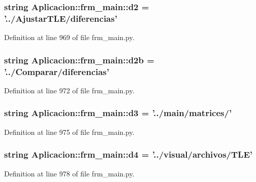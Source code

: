 \subsubsection[{d2}]{\setlength{\rightskip}{0pt plus 5cm}string {\bf \-Aplicacion\-::frm\-\_\-main\-::d2} = '../\-Ajustar\-T\-L\-E/diferencias'}\label{namespace_aplicacion_1_1frm__main_a5b795ba5921a46666c1e779b05cdf3ee}


\-Definition at line 969 of file frm\-\_\-main.\-py.

\subsubsection[{d2b}]{\setlength{\rightskip}{0pt plus 5cm}string {\bf \-Aplicacion\-::frm\-\_\-main\-::d2b} = '../\-Comparar/diferencias'}\label{namespace_aplicacion_1_1frm__main_acb7b8e20c51ef31840addd2e2be958da}


\-Definition at line 972 of file frm\-\_\-main.\-py.

\subsubsection[{d3}]{\setlength{\rightskip}{0pt plus 5cm}string {\bf \-Aplicacion\-::frm\-\_\-main\-::d3} = '../main/matrices/'}\label{namespace_aplicacion_1_1frm__main_a4c4a18684da308be545ba0446c9df47e}


\-Definition at line 975 of file frm\-\_\-main.\-py.

\subsubsection[{d4}]{\setlength{\rightskip}{0pt plus 5cm}string {\bf \-Aplicacion\-::frm\-\_\-main\-::d4} = '../visual/archivos/\-T\-L\-E'}\label{namespace_aplicacion_1_1frm__main_a46e1aa80ab023f60c5e61deac06222f5}


\-Definition at line 978 of file frm\-\_\-main.\-py.

